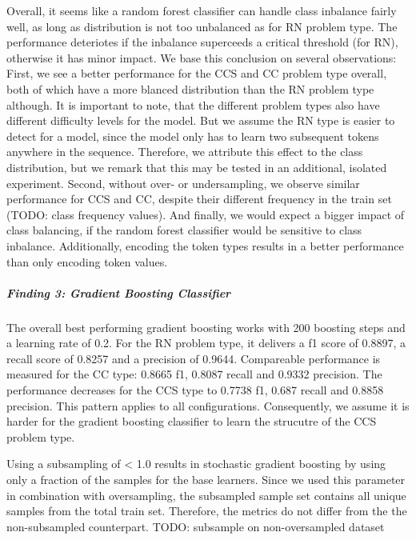 Overall, it seems like a random forest classifier can handle class inbalance fairly well, as long as distribution is not too unbalanced as for RN problem type. The performance deteriotes if the inbalance superceeds a critical threshold (for RN), otherwise it has minor impact.
We base this conclusion on several observations: First, we see a better performance for the CCS and CC problem type overall, both of which have a more blanced distribution than the RN problem type although. It is important to note, that the different problem types also have different difficulty levels for the model. But we assume the RN type is easier to detect for a model, since the model only has to learn two subsequent tokens anywhere in the sequence. Therefore, we attribute this effect to the class distribution, but we remark that this may be tested in an additional, isolated experiment. Second, without over- or undersampling, we observe similar performance for CCS and CC, despite their different frequency in the train set (TODO: class frequency values). And finally, we would expect a bigger impact of class balancing, if the random forest classifier would be sensitive to class inbalance.
Additionally, encoding the token types results in a better performance than only encoding token values.


\subparagraph{Finding 3: Gradient Boosting Classifier}
The overall best performing gradient boosting works with 200 boosting steps and a learning rate of 0.2. For the RN problem type, it delivers a f1 score of 0.8897, a recall score of 0.8257 and a precision of 0.9644. Compareable performance is measured for the CC type: 0.8665 f1, 0.8087 recall and 0.9332 precision. The performance decreases for the CCS type to 0.7738 f1, 0.687 recall and 0.8858 precision. This pattern applies to all configurations. Consequently, we assume it is harder for the gradient boosting classifier to learn the strucutre of the CCS problem type. 

Using a subsampling of < 1.0 results in stochastic gradient boosting by using only a fraction of the samples for the base learners. Since we used this parameter in combination with oversampling, the subsampled sample set contains all unique samples from the total train set. Therefore, the metrics do not differ from the the non-subsampled counterpart. TODO: subsample on non-oversampled dataset

